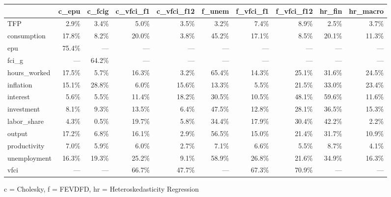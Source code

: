 
\fontsize{12.0pt}{14.4pt}\selectfont
\begin{tabular*}{\linewidth}{@{\extracolsep{\fill}}l|rrrrrrrrr}
\toprule
 & c\_epu & c\_fcig & c\_vfci\_f1 & c\_vfci\_f12 & f\_unem & f\_vfci\_f1 & f\_vfci\_f12 & hr\_fin & hr\_macro \\ 
\midrule\addlinespace[2.5pt]
TFP & 2.9\% & 3.4\% & 5.0\% & 3.5\% & 3.2\% & 7.4\% & 8.9\% & 2.5\% & 3.7\% \\ 
consumption & 17.8\% & 8.2\% & 20.0\% & 3.8\% & 45.2\% & 17.1\% & 8.5\% & 20.1\% & 11.3\% \\ 
epu & 75.4\% & — & — & — & — & — & — & — & — \\ 
fci\_g & — & 64.2\% & — & — & — & — & — & — & — \\ 
hours\_worked & 17.5\% & 5.7\% & 16.3\% & 3.2\% & 65.4\% & 14.3\% & 25.1\% & 31.6\% & 24.5\% \\ 
inflation & 15.1\% & 28.8\% & 6.0\% & 15.6\% & 13.3\% & 5.5\% & 21.5\% & 33.0\% & 23.4\% \\ 
interest & 5.6\% & 5.5\% & 11.4\% & 18.2\% & 30.5\% & 10.5\% & 48.1\% & 59.6\% & 11.6\% \\ 
investment & 8.1\% & 9.3\% & 13.5\% & 6.4\% & 47.5\% & 12.8\% & 28.1\% & 36.5\% & 15.3\% \\ 
labor\_share & 4.3\% & 0.5\% & 19.7\% & 5.8\% & 34.4\% & 17.9\% & 30.4\% & 42.2\% & 2.2\% \\ 
output & 17.2\% & 6.8\% & 16.1\% & 2.9\% & 56.5\% & 15.0\% & 21.4\% & 31.7\% & 10.9\% \\ 
productivity & 7.0\% & 5.9\% & 6.0\% & 2.7\% & 7.1\% & 6.6\% & 5.5\% & 8.7\% & 4.1\% \\ 
unemployment & 16.3\% & 19.3\% & 25.2\% & 9.1\% & 58.9\% & 26.8\% & 21.6\% & 34.9\% & 16.3\% \\ 
vfci & — & — & 66.7\% & 47.7\% & — & 67.3\% & 70.9\% & — & — \\ 
\bottomrule
\end{tabular*}
\begin{minipage}{\linewidth}
c = Cholesky, f = FEVDFD, hr = Heteroskedasticity Regression\\
\end{minipage}


